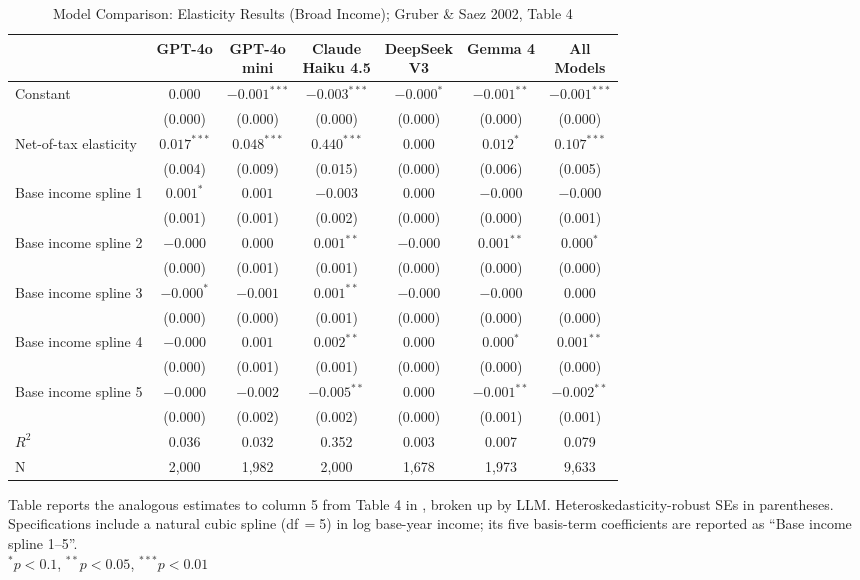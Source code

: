 \begin{table}[!htbp] \centering
  \caption{Model Comparison: Elasticity Results (Broad Income); Gruber \& Saez 2002, Table 4}
  \label{tab:obs_regs_broad}
  \begin{tabular}{lcccccc}
  \toprule
  & GPT-4o & \shortstack{GPT-4o \\ mini} & \shortstack{Claude \\ Haiku 4.5} & \shortstack{DeepSeek \\ V3} & Gemma 4 & \shortstack{All \\ Models} \\
  \midrule
  Constant & $0.000$ & $-0.001^{***}$ & $-0.003^{***}$ & $-0.000^{*}$ & $-0.001^{**}$ & $-0.001^{***}$ \\
  & (0.000) & (0.000) & (0.000) & (0.000) & (0.000) & (0.000) \\
  Net-of-tax elasticity & $0.017^{***}$ & $0.048^{***}$ & $0.440^{***}$ & $0.000$ & $0.012^{*}$ & $0.107^{***}$ \\
  & (0.004) & (0.009) & (0.015) & (0.000) & (0.006) & (0.005) \\
  Base income spline 1 & $0.001^{*}$ & $0.001$ & $-0.003$ & $0.000$ & $-0.000$ & $-0.000$ \\
  & (0.001) & (0.001) & (0.002) & (0.000) & (0.000) & (0.001) \\
  Base income spline 2 & $-0.000$ & $0.000$ & $0.001^{**}$ & $-0.000$ & $0.001^{**}$ & $0.000^{*}$ \\
  & (0.000) & (0.001) & (0.001) & (0.000) & (0.000) & (0.000) \\
  Base income spline 3 & $-0.000^{*}$ & $-0.001$ & $0.001^{**}$ & $-0.000$ & $-0.000$ & $0.000$ \\
  & (0.000) & (0.000) & (0.001) & (0.000) & (0.000) & (0.000) \\
  Base income spline 4 & $-0.000$ & $0.001$ & $0.002^{**}$ & $0.000$ & $0.000^{*}$ & $0.001^{**}$ \\
  & (0.000) & (0.001) & (0.001) & (0.000) & (0.000) & (0.000) \\
  Base income spline 5 & $-0.000$ & $-0.002$ & $-0.005^{**}$ & $0.000$ & $-0.001^{**}$ & $-0.002^{**}$ \\
  & (0.000) & (0.002) & (0.002) & (0.000) & (0.001) & (0.001) \\
  \midrule
  $R^2$ & 0.036 & 0.032 & 0.352 & 0.003 & 0.007 & 0.079 \\
  \midrule
  N & 2,000 & 1,982 & 2,000 & 1,678 & 1,973 & 9,633 \\
  \bottomrule
  \end{tabular}
  \begin{flushleft}\footnotesize
  Table reports the analogous estimates to column 5 from Table 4 in \cite{GruberSaez2002}, broken up by LLM. Heteroskedasticity-robust SEs in parentheses. Specifications include a natural cubic spline (df\,$=$5) in log base-year income; its five basis-term coefficients are reported as ``Base income spline 1--5''.\\
  $^{*}p<0.1$, $^{**}p<0.05$, $^{***}p<0.01$
  \end{flushleft}
\end{table}